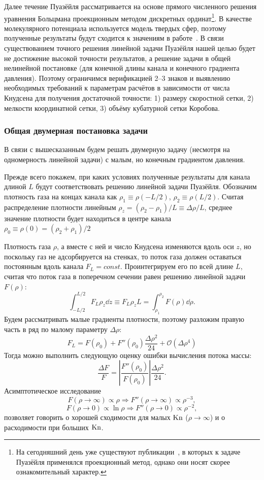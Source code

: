 Далее течение Пуазёйля рассматривается на основе прямого численного решения уравнения Больцмана
проекционным методом дискретных ординат\footnote
{
	На сегодняшний день уже существуют публикации~\cite{Aristov2009}, в которых к задаче Пуазёйля применялся проекционный метод,
	однако они носят скорее ознакомительный характер.
}.
В качестве молекулярного потенциала используется модель твердых сфер,
поэтому полученные результаты будут сходится к значениям в работе~\cite{Ohwada1989b}.
В связи существованием точного решения линейной задачи Пуазёйля нашей целью будет не достижение высокой точности результатов,
а решение задачи в общей нелинейной постановке (для конечной длины канала и конечного градиента давления).
Поэтому ограничимся верификацией 2--3 знаков и выявлению необходимых требований к параметрам расчётов
в зависимости от числа Кнудсена для получения достаточной точности:
1) размеру скоростной сетки, 2) мелкости координатной сетки, 3) объёму кубатурной сетки Коробова.

\subsubsection{Общая двумерная постановка задачи}

В связи с вышесказанным будем решать двумерную задачу (несмотря на одномерность линейной задачи)
с малым, но конечным градиентом давления.

Прежде всего покажем, при каких условиях полученные результаты для канала длиной \(L\)
будут соответствовать решению линейной задачи Пуазёйля.
Обозначим плотность газа на концах канала как \(\rho_1\equiv\rho(-L/2)\), \(\rho_2\equiv\rho(L/2)\).
Считая распределение плотности линейным \(\rho_z = (\rho_2-\rho_1)/L \equiv \Delta\rho/L\),
среднее значение плотности будет находиться в центре канала \(\rho_0\equiv\rho(0) = (\rho_2+\rho_1)/2\)

Плотность газа \(\rho\), а вместе с ней и число Кнудсена изменяются вдоль оси \(z\),
но поскольку газ не адсорбируется на стенках, то поток газа должен оставаться постоянным вдоль канала \(F_L=const\).
Проинтегрируем его по всей длине \(L\), считая что поток газа в поперечном сечении равен решению линейной задачи \(F(\rho)\):
\[ \int_{-L/2}^{L/2}F_L\rho_z\dd z \equiv F_L\rho_zL = \int_{\rho_1}^{\rho_2} F(\rho)\dd\rho. \]
Будем рассматривать малые градиенты плотности, поэтому разложим правую часть в ряд по малому параметру \(\Delta\rho\):
\[ F_L = F(\rho_0) + F''(\rho_0) \frac{\Delta\rho^2}{24} + \mathcal{O}(\Delta\rho^4) \]
Тогда можно выполнить следующую оценку ошибки вычисления потока массы:
\[ \frac{\Delta F}{F} = \left|\frac{F''(\rho_0)}{F(\rho_0)}\right|\frac{\Delta\rho^2}{24}. \]
Асимптотическое исследование
\[ F(\rho\rightarrow\infty) \propto \rho \Rightarrow F''(\rho\rightarrow\infty) \propto \rho^{-3}, \]
\[ F(\rho\rightarrow0) \propto \ln\rho \Rightarrow F''(\rho\rightarrow0) \propto \rho^{-2}, \]
позволяет говорить о хорошей сходимости для малых \(\mathrm{Kn}\) (\(\rho\rightarrow\infty\)) и о расходимости при больших \(\mathrm{Kn}\).

